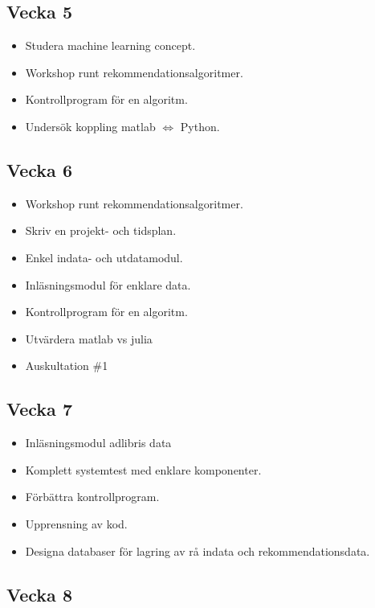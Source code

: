 \documentclass[11pt]{article}
\begin{document}
\subsection*{Vecka 5}

\begin{itemize}
    \item Studera machine learning concept.
    \item Workshop runt rekommendationsalgoritmer.
    \item Kontrollprogram för en algoritm.
    \item Undersök koppling matlab $\Leftrightarrow$ Python.
\end{itemize}


\subsection*{Vecka 6}

\begin{itemize}
    \item Workshop runt rekommendationsalgoritmer.
    \item Skriv en projekt- och tidsplan.
    \item Enkel indata- och utdatamodul.
    \item Inläsningsmodul för enklare data.
    \item Kontrollprogram för en algoritm.
    \item Utvärdera matlab vs julia
    \item Auskultation \#1
\end{itemize}


\subsection*{Vecka 7}

\begin{itemize}
    \item Inläsningsmodul adlibris data
    \item Komplett systemtest med enklare komponenter.
    \item Förbättra kontrollprogram.
    \item Upprensning av kod.
    \item Designa databaser för lagring av rå indata och rekommendationsdata.
\end{itemize}


\subsection*{Vecka 8}
\end{document}

